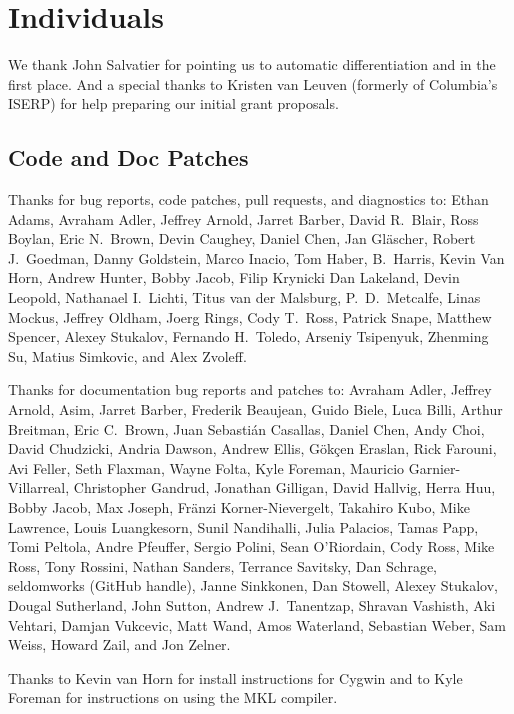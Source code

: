 \section*{Individuals}

We thank John Salvatier for pointing us to automatic differentiation
and \HMC in the first place.  And a special thanks to Kristen van
Leuven (formerly of Columbia's ISERP) for help preparing our initial
grant proposals.

\subsection*{Code  and Doc Patches}

Thanks for bug reports, code patches, pull requests, and diagnostics
to:
Ethan Adams,
Avraham Adler,
Jeffrey Arnold, 
Jarret Barber, 
David R.~Blair, 
Ross Boylan, 
Eric N.~Brown, 
Devin Caughey, 
Daniel Chen,
Jan Gl\"ascher,
Robert J.\ Goedman,
Danny Goldstein,
Marco Inacio, 
Tom Haber,
B.~Harris,
Kevin Van Horn,
Andrew Hunter,
Bobby Jacob,
Filip Krynicki
Dan Lakeland,
Devin Leopold,
Nathanael I.~Lichti,
Titus van der Malsburg,
P.~D.~Metcalfe,
Linas Mockus,
Jeffrey Oldham,
Joerg Rings,
Cody T.\ Ross,
Patrick Snape,
Matthew Spencer,
Alexey Stukalov,
Fernando H.~Toledo,
Arseniy Tsipenyuk,
Zhenming Su,
Matius Simkovic, and
Alex Zvoleff.

Thanks for documentation bug reports and patches to:
Avraham Adler,
Jeffrey Arnold,
Asim,
Jarret Barber,
Frederik Beaujean,
Guido Biele,
Luca Billi,
Arthur Breitman,
Eric C.~Brown,
Juan Sebasti\'an Casallas,
Daniel Chen,
Andy Choi, 
David Chudzicki,
Andria Dawson,
Andrew Ellis,
G\"{o}k\c{c}en Eraslan,
Rick Farouni,
Avi Feller,
Seth Flaxman,
Wayne Folta,
Kyle Foreman,
Mauricio Garnier-Villarreal,
Christopher Gandrud,
Jonathan Gilligan,
David Hallvig,
Herra Huu,
Bobby Jacob,
Max Joseph,
Fr\"anzi Korner-Nievergelt,
Takahiro Kubo,
Mike Lawrence,
Louis Luangkesorn, 
Sunil Nandihalli,
Julia Palacios,
Tamas Papp, 
Tomi Peltola,
Andre Pfeuffer,
Sergio Polini,
Sean O'Riordain,
Cody Ross,
Mike Ross,
Tony Rossini,
Nathan Sanders,
Terrance Savitsky,
Dan Schrage,
seldomworks (GitHub handle),
Janne Sinkkonen,
Dan Stowell,
Alexey Stukalov,
Dougal Sutherland,
John Sutton,
Andrew J.~Tanentzap,
Shravan Vashisth,
Aki Vehtari,
Damjan Vukcevic,
Matt Wand,
Amos Waterland,
Sebastian Weber,
Sam Weiss,
Howard Zail, and
Jon Zelner.

Thanks to Kevin van Horn for install instructions for Cygwin and to
Kyle Foreman for instructions on using the MKL compiler.


